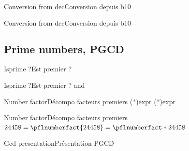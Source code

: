 \documentclass[a4paper,english,11pt]{article}
\begin{document}
\begin{myprestexcode}{Conversion from dec}{Conversion depuis b10}

\end{myprestexcode}

\begin{myprestex}{Conversion from dec}{Conversion depuis b10}
\end{myprestex}

\subsection{Prime numbers, PGCD}

\begin{myprestexcode}{Isprime ?}{Est premier ?}
\end{myprestexcode}

\begin{myprestex}{Isprime ?}{Est premier ?}
 and 
\end{myprestex}

\begin{myprestexcode}{Number factor}{Décompo facteurs premiers}
\pflnumberfact(*){expr}
\pfldecompnb(*){expr}

\end{myprestexcode}

\begin{myprestex}{Number factor}{Décompo facteurs premiers}
$24458=\pflnumberfact{24458}=\pflnumberfact*{24458}$
\end{myprestex}

\begin{myprestexcode}{Gcd presentation}{Présentation PGCD}

\end{myprestexcode}
\end{document}
